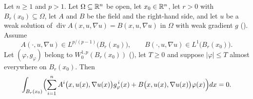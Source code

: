 \begin{lemma}
Let $n\ge1$ and $p>1$.  Let $\Omega\subseteq\mathbb{R}^n$ be open, let $x_0\in\mathbb{R}^n$, let
$r>0$ with $B_r(x_0)\subseteq\Omega$, let $A$ and $B$ be the field and the
right-hand side, and let $u$ be a weak solution of
$\operatorname{div}A(x,u,\nabla u)=B(x,u,\nabla u)$ in $\Omega$ with weak
gradient $g$ ().  Assume
\[
A(\cdot,u,\nabla u)\in L^{p/(p-1)}\bigl(B_r(x_0)\bigr),
\qquad
B(\cdot,u,\nabla u)\in L^{1}\bigl(B_r(x_0)\bigr).
\]
Let $(\varphi,g_\varphi)$ belong to $W^{1,p}_0(B_r(x_0))$
(), let $T\ge0$ and suppose $|\varphi|\le T$ almost
everywhere on $B_r(x_0)$.  Then
\[
\int_{B_r(x_0)}\Bigl(\sum_{i=1}^n A^i\bigl(x,u(x),\nabla u(x)\bigr)
g_\varphi^{\,i}(x)+B\bigl(x,u(x),\nabla u(x)\bigr)\varphi(x)\Bigr)dx=0 .
\]
\end{lemma}
